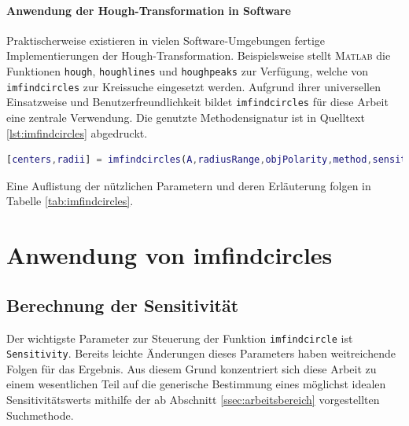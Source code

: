 \documentclass[accentcolor=tud1c, 11pt, toc=bib, toc=listof, captions=abovetable, parskip=half]{tudreport}
\begin{document}
\paragraph{Anwendung der Hough-Transformation in Software}
Praktischerweise existieren in vielen Software-Umgebungen fertige Implementierungen der Hough-Transformation. Beispielsweise stellt \textsc{Matlab} die Funktionen \lstinline|hough|, \lstinline|houghlines| und \lstinline|houghpeaks| zur Verfügung, welche von \lstinline|imfindcircles| zur Kreissuche eingesetzt werden. Aufgrund ihrer universellen Einsatzweise und Benutzerfreundlichkeit bildet \lstinline|imfindcircles| für diese Arbeit eine zentrale Verwendung. Die genutzte Methodensignatur ist in Quelltext \ref{lst:imfindcircles} abgedruckt.\\

\begin{lstlisting}[language=MATLAB, caption=Berechnung des Startwertes mithilfe binärer Suche, label=lst:imfindcircles]
[centers,radii] = imfindcircles(A,radiusRange,objPolarity,method,sensitivity);
\end{lstlisting}

Eine Auflistung der nützlichen Parametern und deren Erläuterung folgen in Tabelle \ref{tab:imfindcircles}.\\

\begin{table}
	\caption{Auflistung aller genutzten Parameter-Value-Paare der Funktion \lstinline|imfindcircles|}
	\centering
	
	\label{tab:imfindcircles}
\end{table}

\section{Anwendung von imfindcircles}
\subsection{Berechnung der Sensitivität}
\label{ssec:sensitivitätsberechnung}
Der wichtigste Parameter zur Steuerung der Funktion \lstinline|imfindcircle| ist \lstinline|Sensitivity|. Bereits leichte Änderungen dieses Parameters haben weitreichende Folgen für das Ergebnis. Aus diesem Grund konzentriert sich diese Arbeit zu einem wesentlichen Teil auf die generische Bestimmung eines möglichst idealen Sensitivitätswerts mithilfe der ab Abschnitt \ref{ssec:arbeitsbereich} vorgestellten Suchmethode. \\
\end{document}
